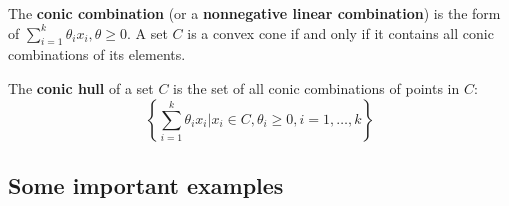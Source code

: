 The \textbf{conic combination} (or a \textbf{nonnegative linear combination}) is the form of $\sum_{i=1}^{k}\theta_i x_i, \theta \geq 0$. A set $C$ is a convex cone if and only if it contains all conic combinations of its elements.

The \textbf{conic hull} of a set $C$ is the set of all conic combinations of points in $C$:
\[
\left\{ \sum_{i=1}^{k}\theta_i x_i |x_i \in C, \theta_i \geq 0, i=1,\dots,k \right\}
\]

\subsection{Some important examples}
